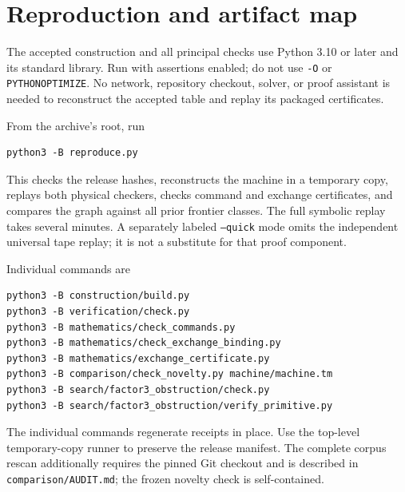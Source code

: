 \documentclass[10pt,letterpaper]{article}
\newcommand{\file}[1]{\nolinkurl{#1}}
\begin{document}
\section{Reproduction and artifact map}

The accepted construction and all principal checks use Python 3.10 or
later and its standard library. Run with assertions enabled; do not use
\texttt{-O} or \texttt{PYTHONOPTIMIZE}. No network, repository checkout,
solver, or proof assistant is needed to reconstruct the accepted table
and replay its packaged certificates.

From the archive's root, run
\begin{verbatim}
python3 -B reproduce.py
\end{verbatim}
This checks the release hashes, reconstructs the machine in a temporary
copy, replays both physical checkers, checks command and exchange
certificates, and compares the graph against all prior frontier classes.
The full symbolic replay takes several minutes. A separately labeled
\texttt{--quick} mode omits the independent universal tape replay; it is
not a substitute for that proof component.

Individual commands are
\begin{verbatim}
python3 -B construction/build.py
python3 -B verification/check.py
python3 -B mathematics/check_commands.py
python3 -B mathematics/check_exchange_binding.py
python3 -B mathematics/exchange_certificate.py
python3 -B comparison/check_novelty.py machine/machine.tm
python3 -B search/factor3_obstruction/check.py
python3 -B search/factor3_obstruction/verify_primitive.py
\end{verbatim}
The individual commands regenerate receipts in place. Use the top-level
temporary-copy runner to preserve the release manifest. The complete
corpus rescan additionally requires the pinned Git checkout and is described
in \file{comparison/AUDIT.md}; the frozen novelty check is self-contained.
\end{document}

